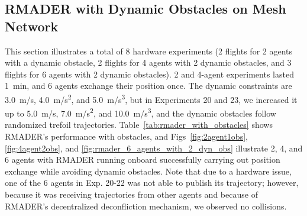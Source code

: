 \begin{table}
\caption{\centering RMADER on Mesh Metwork}
\label{tab:rmader_hw_mesh}
\begin{centering}
\renewcommand{\arraystretch}{1.2}
\par\end{centering}
\end{table}

\subsection{RMADER with Dynamic Obstacles on Mesh Network}
This section illustrates a total of 8 hardware experiments (2 flights for 2 agents with a dynamic obstacle, 2 flights for 4 agents with 2 dynamic obstacles, and 3 flights for 6 agents with 2 dynamic obstacles). 2 and 4-agent experiments lasted \SI{1}{\minute}, and 6 agents exchange their position once. The dynamic constraints are \SI{3.0}{m/s}, \SI{4.0}{m/s^2}, and \SI{5.0}{m/s^3}, but in Experiments 20 and 23, we increased it up to \SI{5.0}{m/s}, \SI{7.0}{m/s^2}, and \SI{10.0}{m/s^3}, and the dynamic obstacles follow randomized trefoil trajectories. 
Table~\ref{tab:rmader_with_obstacles} shows RMADER's performance with obstacles, and Figs~\ref{fig:2agent1obs}, \ref{fig:4agent2obs}, and \ref{fig:rmader_6_agents_with_2_dyn_obs} illustrate 2, 4, and 6 agents with RMADER running onboard successfully carrying out position exchange while avoiding dynamic obstacles.    
Note that due to a hardware issue, one of the 6 agents in Exp. 20-22 was not able to publish its trajectory; however, because it was receiving trajectories from other agents and because of RMADER's decentralized deconfliction mechanism, we observed no collisions. 

